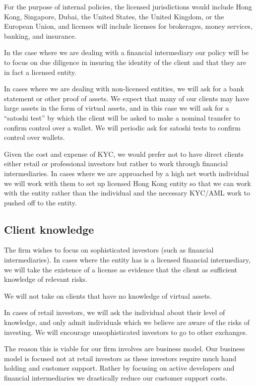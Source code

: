 For the purpose of internal policies, the licensed jurisdictions would
include Hong Kong, Singapore, Dubai, the United States, the United
Kingdom, or the European Union, and licenses will include licenses for
brokerages, money services, banking, and insurance.

In the case where we are dealing with a financial intermediary our
policy will be to focus on due diligence in insuring the identity of
the client and that they are in fact a licensed entity.

In cases where we are dealing with non-licensed entities, we will ask
for a bank statement or other proof of assets.  We expect that many of
our clients may have large assets in the form of virtual assets, and
in this case we will ask for a ``satoshi test'' by which the client
will be asked to make a nominal transfer to confirm control over a
wallet.  We will periodic ask for satoshi tests to confirm control
over wallets.

Given the cost and expense of KYC, we would prefer not to have direct
clients either retail or professional investors but rather to work
through financial intermediaries.  In cases where we are approached by
a high net worth individual we will work with them to set up licensed
Hong Kong entity so that we can work with the entity rather than the
individual and the necessary KYC/AML work to pushed off to the entity.

\subsection{Client knowledge}

The firm wishes to focus on sophisticated investors (such as financial
intermediaries).  In cases where the entity has is a licensed
financial intermediary, we will take the existence of a license as
evidence that the client as sufficient knowledge of relevant risks.

We will not take on clients that have no knowledge of virtual assets.

In cases of retail investors, we will ask the individual about their
level of knowledge, and only admit individuals which we believe are
aware of the risks of investing.  We will encourage unsophisticated
investors to go to other exchanges.

The reason this is viable for our firm involves are business model.
Our business model is focused not at retail investors as these
investors require much hand holding and customer support.  Rather by
focusing on active developers and financial intermediaries we
drastically reduce our customer support costs.

